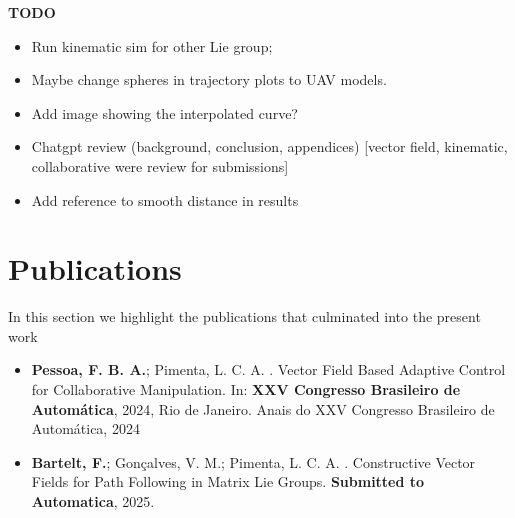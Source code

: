\textbf{TODO}
\begin{itemize}
    \item Run kinematic sim for other Lie group;
    \item Maybe change spheres in trajectory plots to UAV models.
    \item Add image showing the interpolated curve?
    \item Chatgpt review (background, conclusion, appendices) [vector field, kinematic, collaborative were review for submissions]
    \item Add reference to smooth distance in results
\end{itemize}
\section{Publications}
In this section we highlight the publications that culminated into the present work
\begin{itemize}
    \item \textbf{Pessoa, F. B. A.}; Pimenta, L. C. A. . Vector Field Based Adaptive Control for Collaborative Manipulation. In: \textbf{XXV Congresso Brasileiro de Automática}, 2024, Rio de Janeiro. Anais do XXV Congresso Brasileiro de Automática, 2024
    \item \textbf{Bartelt, F.}; Gonçalves, V. M.; Pimenta, L. C. A. . Constructive Vector Fields for Path Following in Matrix Lie Groups. \textbf{Submitted to Automatica}, 2025.
\end{itemize}
